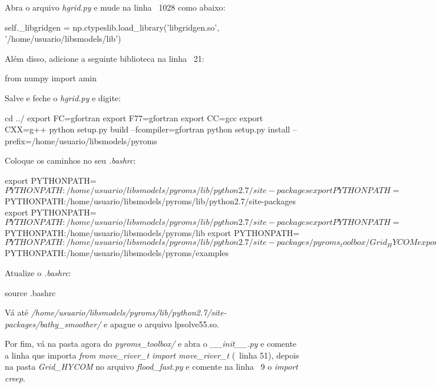 \noindent Abra o arquivo \textit{hgrid.py} e mude na linha ~1028 como abaixo:
\bigskip

\begin{bashcode}[fontsize=\scriptsize]
self._libgridgen = np.ctypeslib.load_library('libgridgen.so', '/home/usuario/libsmodels/lib')
\end{bashcode}
\bigskip

\noindent Além disso, adicione a seguinte biblioteca na linha ~21:
\bigskip

\begin{bashcode}
from numpy import amin
\end{bashcode}
\bigskip

\noindent Salve e feche o \textit{hgrid.py} e digite:
\bigskip

\begin{bashcode}
cd ../
export FC=gfortran
export F77=gfortran
export CC=gcc
export CXX=g++
python setup.py build --fcompiler=gfortran
python setup.py install --prefix=/home/usuario/libsmodels/pyroms
\end{bashcode}
\bigskip

\noindent Coloque os caminhos no seu \textit{.bashrc}:
\bigskip

\begin{bashcode}[fontsize=\tiny]
export PYTHONPATH=$PYTHONPATH:/home/usuario/libsmodels/pyroms/lib/python2.7/site-packages
export PYTHONPATH=$PYTHONPATH:/home/usuario/libsmodels/pyroms/lib/python2.7/site-packages
export PYTHONPATH=$PYTHONPATH:/home/usuario/libsmodels/pyroms/lib/python2.7/site-packages
export PYTHONPATH=$PYTHONPATH:/home/usuario/libsmodels/pyroms/lib
export PYTHONPATH=$PYTHONPATH:/home/usuario/libsmodels/pyroms/lib/python2.7/site-packages/pyroms_toolbox/Grid_HYCOM
export PYTHONPATH=$PYTHONPATH:/home/usuario/libsmodels/pyroms/examples
\end{bashcode}
\bigskip

\noindent Atualize o \textit{.bashrc}:
\bigskip
\begin{bashcode}
source .bashrc
\end{bashcode}
\bigskip

\noindent Vá até \textit{/home/usuario/libsmodels/pyroms/lib/python2.7/site-packages/bathy\_smoother/} e apague o arquivo lpsolve55.so.
\bigskip

\noindent Por fim, vá na pasta agora do \textit{pyroms\_toolbox/} e abra o \textit{\_\_init\_\_.py} e comente a linha que importa \textit{from move\_river\_t import move\_river\_t} (~linha 51), depois na pasta \textit{Grid\_HYCOM} no arquivo \textit{flood\_fast.py} e comente na linha ~9 o \textit{import creep}.
\bigskip


